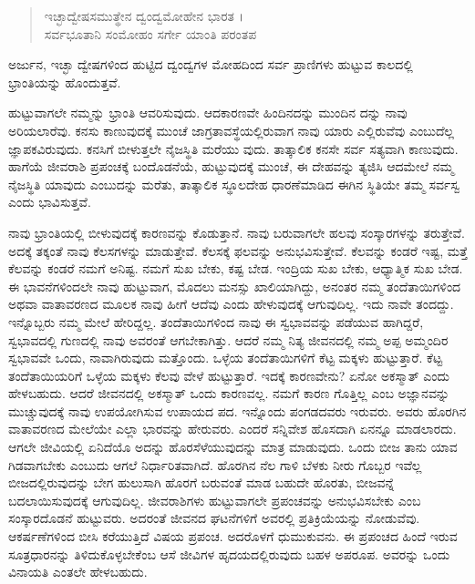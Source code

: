 \begin{verse}
ಇಚ್ಛಾದ್ವೇಷಸಮುತ್ಥೇನ ದ್ವಂದ್ವಮೋಹೇನ ಭಾರತ ।\\ಸರ್ವಭೂತಾನಿ ಸಂಮೋಹಂ ಸರ್ಗೇ ಯಾಂತಿ ಪರಂತಪ 
\end{verse}

{\small ಅರ್ಜುನ, ಇಚ್ಛಾ ದ್ವೇಷಗಳಿಂದ ಹುಟ್ಟಿದ ದ್ವಂದ್ವಗಳ ಮೋಹದಿಂದ ಸರ್ವ ಪ್ರಾಣಿಗಳು ಹುಟ್ಟುವ ಕಾಲದಲ್ಲಿ ಭ್ರಾಂತಿಯನ್ನು ಹೊಂದುತ್ತವೆ.}

ಹುಟ್ಟುವಾಗಲೇ ನಮ್ಮನ್ನು ಭ್ರಾಂತಿ ಆವರಿಸುವುದು. ಆದಕಾರಣವೇ ಹಿಂದಿನದನ್ನು ಮುಂದಿನ ದನ್ನು ನಾವು ಅರಿಯಲಾರೆವು. ಕನಸು ಕಾಣುವುದಕ್ಕೆ ಮುಂಚೆ ಜಾಗ್ರತಾವಸ್ಥೆಯಲ್ಲಿರುವಾಗ ನಾವು ಯಾರು ಎಲ್ಲಿರುವೆವು ಎಂಬುದೆಲ್ಲ ಜ್ಞಾಪಕವಿರುವುದು. ಕನಸಿಗೆ ಬೀಳುತ್ತಲೇ ನೈಜಸ್ಥಿತಿ ಮರೆಯು ವುದು. ತಾತ್ಕಾಲಿಕ ಕನಸೇ ಸರ್ವ ಸತ್ಯವಾಗಿ ಕಾಣುವುದು. ಹಾಗೆಯೆ ಜೀವರಾಶಿ ಪ್ರಪಂಚಕ್ಕೆ ಬಂದೊಡನೆಯೆ, ಹುಟ್ಟುವುದಕ್ಕೆ ಮುಂಚೆ, ಈ ದೇಹವನ್ನು ತ್ಯಜಿಸಿ ಆದಮೇಲೆ ನಮ್ಮ ನೈಜಸ್ಥಿತಿ ಯಾವುದು ಎಂಬುದನ್ನು ಮರೆತು, ತಾತ್ಕಾಲಿಕ ಸ್ಥೂಲದೇಹ ಧಾರಣೆಮಾಡಿದ ಈಗಿನ ಸ್ಥಿತಿಯೇ ತಮ್ಮ ಸರ್ವಸ್ವ ಎಂದು ಭಾವಿಸುತ್ತವೆ.

ನಾವು ಭ್ರಾಂತಿಯಲ್ಲಿ ಬೀಳುವುದಕ್ಕೆ ಕಾರಣವನ್ನು ಕೊಡುತ್ತಾನೆ. ನಾವು ಬರುವಾಗಲೇ ಹಲವು ಸಂಸ್ಕಾರಗಳನ್ನು ತರುತ್ತೇವೆ. ಅದಕ್ಕೆ ತಕ್ಕಂತೆ ನಾವು ಕೆಲಸಗಳನ್ನು ಮಾಡುತ್ತೇವೆ. ಕೆಲಸಕ್ಕೆ ಫಲವನ್ನು ಅನುಭವಿಸುತ್ತೇವೆ. ಕೆಲವನ್ನು ಕಂಡರೆ ಇಷ್ಟ, ಮತ್ತೆ ಕೆಲವನ್ನು ಕಂಡರೆ ನಮಗೆ ಅನಿಷ್ಟ. ನಮಗೆ ಸುಖ ಬೇಕು, ಕಷ್ಟ ಬೇಡ. ಇಂದ್ರಿಯ ಸುಖ ಬೇಕು, ಆಧ್ಯಾತ್ಮಿಕ ಸುಖ ಬೇಡ. ಈ ಭಾವನೆಗಳಿಂದಲೇ ನಾವು ಹುಟ್ಟುವಾಗ, ಮೊದಲು ಮನಸ್ಸು ಖಾಲಿಯಾಗಿದ್ದು, ಅನಂತರ ನಮ್ಮ ತಂದೆತಾಯಿಗಳಿಂದ ಅಥವಾ ವಾತಾವರಣದ ಮೂಲಕ ನಾವು ಹೀಗೆ ಆದೆವು ಎಂದು ಹೇಳುವುದಕ್ಕೆ ಆಗುವುದಿಲ್ಲ. ಇದು ನಾವೇ ತಂದದ್ದು. ಇನ್ನೊಬ್ಬರು ನಮ್ಮ ಮೇಲೆ ಹೇರಿದ್ದಲ್ಲ. ತಂದೆತಾಯಿಗಳಿಂದ ನಾವು ಈ ಸ್ವಭಾವವನ್ನು ಪಡೆಯುವ ಹಾಗಿದ್ದರೆ, ಸ್ವಭಾವದಲ್ಲಿ ಗುಣದಲ್ಲಿ ನಾವು ಅವರಂತೆ ಆಗಬೇಕಾಗಿತ್ತು. ಆದರೆ ನಮ್ಮ ನಿತ್ಯ ಜೀವನದಲ್ಲಿ ನಮ್ಮ ಅಪ್ಪ ಅಮ್ಮಂದಿರ ಸ್ವಭಾವವೇ ಒಂದು, ನಾವಾಗಿರುವುದು ಮತ್ತೊಂದು. ಒಳ್ಳೆಯ ತಂದೆತಾಯಿಗಳಿಗೆ ಕೆಟ್ಟ ಮಕ್ಕಳು ಹುಟ್ಟುತ್ತಾರೆ. ಕೆಟ್ಟ ತಂದೆತಾಯಿಯರಿಗೆ ಒಳ್ಳೆಯ ಮಕ್ಕಳು ಕೆಲವು ವೇಳೆ ಹುಟ್ಟುತ್ತಾರೆ. ಇದಕ್ಕೆ ಕಾರಣವೇನು? ಏನೋ ಅಕಸ್ಮಾತ್ ಎಂದು ಹೇಳಬಹುದು. ಆದರೆ ಜೀವನದಲ್ಲಿ ಅಕಸ್ಮಾತ್ ಒಂದು ಕಾರಣವಲ್ಲ. ನಮಗೆ ಕಾರಣ ಗೊತ್ತಿಲ್ಲ ಎಂಬ ಅಜ್ಞಾನವನ್ನು ಮುಚ್ಚುವುದಕ್ಕೆ ನಾವು ಉಪಯೋಗಿಸುವ ಉಪಾಯದ ಪದ. ಇನ್ನೊಂದು ಪಂಗಡದವರು ಇರುವರು. ಅವರು ಹೊರಗಿನ ವಾತಾವರಣದ ಮೇಲೆಯೇ ಎಲ್ಲಾ ಭಾರವನ್ನು ಹೇರುವರು. ಎಂದರೆ ಸನ್ನಿವೇಶ ಹೊಸದಾಗಿ ಏನನ್ನೂ ಮಾಡಲಾರದು. ಆಗಲೇ ಜೀವಿಯಲ್ಲಿ ಏನಿದೆಯೊ ಅದನ್ನು ಹೊರಸೆಳೆಯುವುದನ್ನು ಮಾತ್ರ ಮಾಡುವುದು. ಒಂದು ಬೀಜ ತಾನು ಯಾವ ಗಿಡವಾಗಬೇಕು ಎಂಬುದು ಆಗಲೆ ನಿರ್ಧಾರಿತವಾಗಿದೆ. ಹೊರಗಿನ ನೆಲ ಗಾಳಿ ಬೆಳಕು ನೀರು ಗೊಬ್ಬರ ಇವೆಲ್ಲ ಬೀಜದಲ್ಲಿರುವುದನ್ನು ಬೇಗ ಹುಲುಸಾಗಿ ಹೊರಗೆ ಬರುವಂತೆ ಮಾಡ ಬಹುದೇ ಹೊರತು, ಬೀಜವನ್ನೆ ಬದಲಾಯಿಸುವುದಕ್ಕೆ ಆಗುವುದಿಲ್ಲ. ಜೀವರಾಶಿಗಳು ಹುಟ್ಟುವಾಗಲೇ ಪ್ರಪಂಚವನ್ನು ಅನುಭವಿಸಬೇಕು ಎಂಬ ಸಂಸ್ಕಾರದೊಡನೆ ಹುಟ್ಟುವರು. ಅದರಂತೆ ಜೀವನದ ಘಟನೆಗಳಿಗೆ ಅವರಲ್ಲಿ ಪ್ರತಿಕ್ರಿಯೆಯನ್ನು ನೋಡುವೆವು. ಆಕರ್ಷಣೆಗಳಿಂದ ಬೀಸಿ ಕರೆಯುತ್ತಿದೆ ವಿಷಯ ಪ್ರಪಂಚ. ಅದರೊಳಗೆ ಧುಮುಕುವನು. ಈ ಪ್ರಪಂಚದ ಹಿಂದೆ ಇರುವ ಸೂತ್ರಧಾರನನ್ನು ತಿಳಿದುಕೊಳ್ಳಬೇಕೆಂಬ ಆಸೆ ಜೀವಿಗಳ ಹೃದಯದಲ್ಲಿರುವುದು ಬಹಳ ಅಪರೂಪ. ಅವರನ್ನು ಒಂದು ವಿನಾಯತಿ  ಎಂತಲೇ ಹೇಳಬಹುದು.

